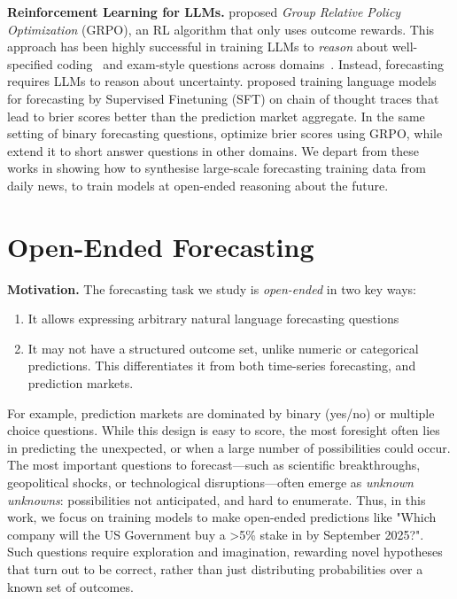 \textbf{Reinforcement Learning for LLMs.} \citet{shao2024deepseekmath} proposed \textit{Group Relative Policy Optimization} (GRPO), an RL algorithm that only uses outcome rewards. This approach has been highly successful in training LLMs to \textit{reason} about well-specified coding~\citep{jain2024livecodebench} and exam-style questions across domains~\citep{phan2025humanity}. Instead, forecasting requires LLMs to reason about uncertainty. \citet{halawi2024approaching} proposed training language models for forecasting by Supervised Finetuning (SFT) on chain of thought traces that lead to brier scores better than the prediction market aggregate. In the same setting of binary forecasting questions, \citet{turtel2025llms} optimize brier scores using GRPO, while ~\citet{damani2025beyond} extend it to short answer questions in other domains. We depart from these works in showing how to synthesise large-scale forecasting training data from daily news, to train models at open-ended reasoning about the future. 


\section{Open-Ended Forecasting}
\label{sec:open-ended}

\textbf{Motivation.} The forecasting task we study is \textit{open-ended} in two key ways: 
\begin{enumerate}
    \item It allows expressing arbitrary natural language forecasting questions
    \item It may not have a structured outcome set, unlike numeric or categorical predictions. This differentiates it from both time-series forecasting, and prediction markets.
\end{enumerate}
For example, prediction markets are dominated by binary (yes/no) or multiple choice questions. While this design is easy to score, the most foresight often lies in predicting the unexpected, or when a large number of possibilities could occur. The most important questions to forecast---such as scientific breakthroughs, geopolitical shocks, or technological disruptions---often emerge as \emph{unknown unknowns}: possibilities not anticipated, and hard to enumerate. Thus, in this work, we focus on training models to make open-ended predictions like "Which company will the US Government buy a >5\% stake in by September 2025?". Such questions require exploration and imagination, rewarding novel hypotheses that turn out to be correct, rather than just distributing probabilities over a known set of outcomes.\vspace{0.15cm} 

